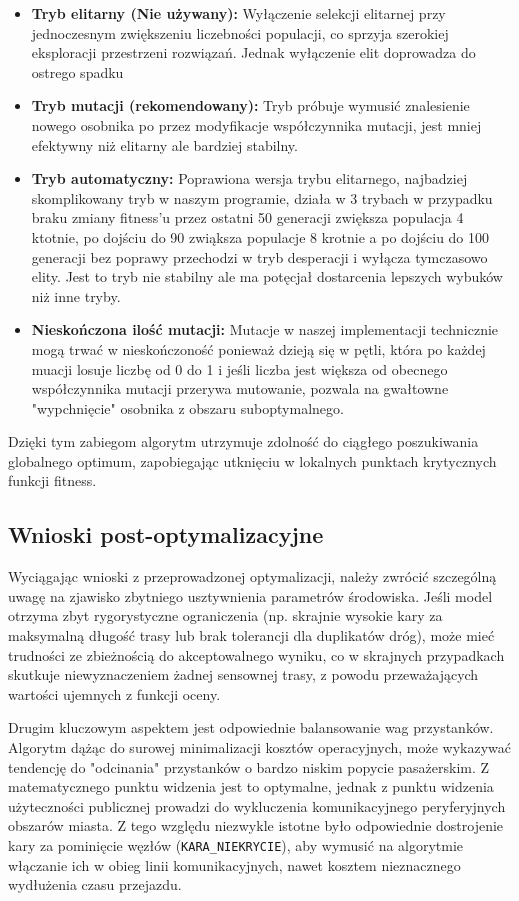 \begin{itemize}
    \item \textbf{Tryb elitarny (Nie używany):} Wyłączenie selekcji elitarnej przy jednoczesnym zwiększeniu liczebności populacji, co sprzyja szerokiej eksploracji przestrzeni rozwiązań. Jednak wyłączenie elit doprowadza do ostrego spadku
    \item \textbf{Tryb mutacji (rekomendowany):} Tryb próbuje wymusić znalesienie nowego osobnika po przez modyfikacje współczynnika mutacji, jest mniej efektywny niż elitarny ale bardziej stabilny.
    \item \textbf{Tryb automatyczny:} Poprawiona wersja trybu elitarnego, najbadziej skomplikowany tryb w naszym programie, działa w 3 trybach w przypadku braku zmiany fitness'u przez ostatni 50 generacji zwiększa populacja 4 ktotnie, po dojściu do 90 zwiąksza populacje 8 krotnie a po dojściu do 100 generacji bez poprawy przechodzi w tryb desperacji i wyłącza tymczasowo elity. Jest to tryb nie stabilny ale ma potęcjał dostarcenia lepszych wybuków niż inne tryby.
    \item \textbf{Nieskończona ilość mutacji:} Mutacje w naszej implementacji technicznie mogą trwać w nieskończoność ponieważ dzieją się w pętli, która po każdej muacji losuje liczbę od 0 do 1 i jeśli liczba jest większa od obecnego współczynnika mutacji przerywa mutowanie, pozwala na gwałtowne "wypchnięcie" osobnika z obszaru suboptymalnego.
\end{itemize}

Dzięki tym zabiegom algorytm utrzymuje zdolność do ciągłego poszukiwania globalnego optimum, zapobiegając utknięciu w lokalnych punktach krytycznych funkcji fitness.

\subsection{Wnioski post-optymalizacyjne}
Wyciągając wnioski z przeprowadzonej optymalizacji, należy zwrócić szczególną uwagę na zjawisko zbytniego usztywnienia parametrów środowiska. Jeśli model otrzyma zbyt rygorystyczne ograniczenia (np. skrajnie wysokie kary za maksymalną długość trasy lub brak tolerancji dla duplikatów dróg), może mieć trudności ze zbieżnością do akceptowalnego wyniku, co w skrajnych przypadkach skutkuje niewyznaczeniem żadnej sensownej trasy, z powodu przeważających wartości ujemnych z funkcji oceny.

Drugim kluczowym aspektem jest odpowiednie balansowanie wag przystanków. Algorytm dążąc do surowej minimalizacji kosztów operacyjnych, może wykazywać tendencję do "odcinania" przystanków o bardzo niskim popycie pasażerskim. Z matematycznego punktu widzenia jest to optymalne, jednak z punktu widzenia użyteczności publicznej prowadzi do wykluczenia komunikacyjnego peryferyjnych obszarów miasta. Z tego względu niezwykle istotne było odpowiednie dostrojenie kary za pominięcie węzłów (\texttt{KARA\_NIEKRYCIE}), aby wymusić na algorytmie włączanie ich w obieg linii komunikacyjnych, nawet kosztem nieznacznego wydłużenia czasu przejazdu.

